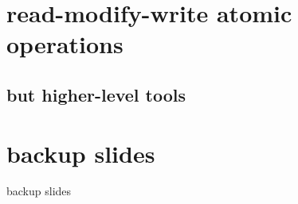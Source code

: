 
\section{read-modify-write atomic operations}


\subsection{but higher-level tools}





\section{backup slides}
\begin{frame}{backup slides}
\end{frame}




